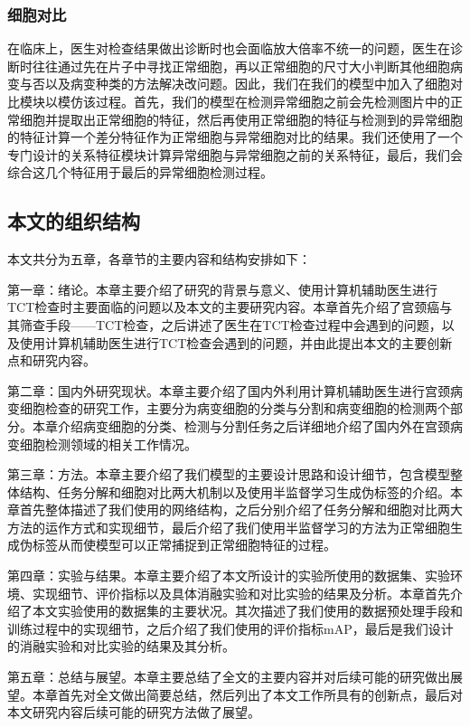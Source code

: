 \subsubsection{细胞对比}
\par 在临床上，医生对检查结果做出诊断时也会面临放大倍率不统一的问题，医生在诊断时往往通过先在片子中寻找正常细胞，再以正常细胞的尺寸大小判断其他细胞病变与否以及病变种类的方法解决改问题。因此，我们在我们的模型中加入了细胞对比模块以模仿该过程。首先，我们的模型在检测异常细胞之前会先检测图片中的正常细胞并提取出正常细胞的特征，然后再使用正常细胞的特征与检测到的异常细胞的特征计算一个差分特征作为正常细胞与异常细胞对比的结果。我们还使用了一个专门设计的关系特征模块计算异常细胞与异常细胞之前的关系特征，最后，我们会综合这几个特征用于最后的异常细胞检测过程。

\subsection{本文的组织结构}
\par 本文共分为五章，各章节的主要内容和结构安排如下：
\par 第一章：绪论。本章主要介绍了研究的背景与意义、使用计算机辅助医生进行TCT检查时主要面临的问题以及本文的主要研究内容。本章首先介绍了宫颈癌与其筛查手段——TCT检查，之后讲述了医生在TCT检查过程中会遇到的问题，以及使用计算机辅助医生进行TCT检查会遇到的问题，并由此提出本文的主要创新点和研究内容。
\par 第二章：国内外研究现状。本章主要介绍了国内外利用计算机辅助医生进行宫颈病变细胞检查的研究工作，主要分为病变细胞的分类与分割和病变细胞的检测两个部分。本章介绍病变细胞的分类、检测与分割任务之后详细地介绍了国内外在宫颈病变细胞检测领域的相关工作情况。
\par 第三章：方法。本章主要介绍了我们模型的主要设计思路和设计细节，包含模型整体结构、任务分解和细胞对比两大机制以及使用半监督学习生成伪标签的介绍。本章首先整体描述了我们使用的网络结构，之后分别介绍了任务分解和细胞对比两大方法的运作方式和实现细节，最后介绍了我们使用半监督学习的方法为正常细胞生成伪标签从而使模型可以正常捕捉到正常细胞特征的过程。
\par 第四章：实验与结果。本章主要介绍了本文所设计的实验所使用的数据集、实验环境、实现细节、评价指标以及具体消融实验和对比实验的结果及分析。本章首先介绍了本文实验使用的数据集的主要状况。其次描述了我们使用的数据预处理手段和训练过程中的实现细节，之后介绍了我们使用的评价指标mAP，最后是我们设计的消融实验和对比实验的结果及其分析。
\par 第五章：总结与展望。本章主要总结了全文的主要内容并对后续可能的研究做出展望。本章首先对全文做出简要总结，然后列出了本文工作所具有的创新点，最后对本文研究内容后续可能的研究方法做了展望。

